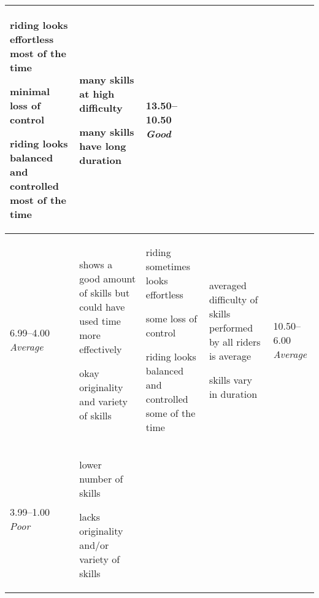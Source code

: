 \begin{minipage}{\textwidth}
\begin{longtable}{|p{1.5cm}|p{5cm}|p{5cm}|p{5cm}|p{1.5cm}|}
\begin{judging_items}%
\item riding looks effortless most of the time
\item minimal loss of control
\item riding looks balanced and controlled most of the time
\end{judging_items} &

\begin{judging_items}%
\item many skills at high difficulty
\item many skills have long duration
\end{judging_items} &

13.50--10.50 \newline
\emph{Good} \\
\hline

6.99--4.00 \newline
\emph{Average} &

\begin{judging_items}%
\item shows a good amount of skills but could have used time more effectively
\item okay originality and variety of skills
\end{judging_items} &

\begin{judging_items}%
\item riding sometimes looks effortless
\item some loss of control
\item riding looks balanced and controlled some of the time
\end{judging_items} &

\begin{judging_items}%
\item averaged difficulty of skills performed by all riders is average
\item skills vary in duration
\end{judging_items} &

10.50--6.00 \newline
\emph{Average} \\
\hline

3.99--1.00 \newline
\emph{Poor} &

\begin{judging_items}%
\item lower number of skills
\item lacks originality and/or variety of skills
\end{judging_items} &


\end{longtable}
\end{minipage}
